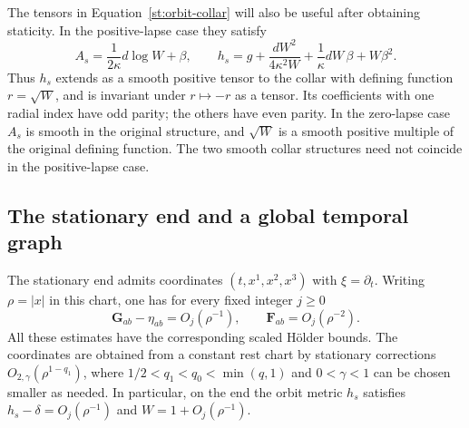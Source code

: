 \begin{remark}\label{st:orbit-boundary}
The tensors in Equation~\eqref{st:orbit-collar} will also be useful
after obtaining staticity.  In the positive-lapse case they satisfy
\[
 A_s=\frac{1}{2\kappa}d\log W+\beta,
 \qquad
 h_s=g+\frac{dW^2}{4\kappa^2W}
       +\frac{1}{\kappa}dW\,\beta+W\beta^2.
\]
Thus $h_s$ extends as a smooth positive tensor to the collar with
defining function $r=\sqrt W$, and is invariant under $r\mapsto-r$
as a tensor.  Its coefficients with one radial index have odd
parity; the others have even parity.  In the zero-lapse case $A_s$
is smooth in the original structure, and $\sqrt W$ is a smooth
positive multiple of the original defining function.  The two
smooth collar structures need not coincide in the positive-lapse
case.
\end{remark}

\subsection{The stationary end and a global temporal graph}

\begin{proposition}\label{st:stationary-end}
The stationary end admits coordinates $(t,x^1,x^2,x^3)$ with
$\xi=\partial_t$.  Writing $\rho=|x|$ in this chart, one has for
every fixed integer $j\geq0$
\begin{equation}\label{st:strong-end}
 \mathbf G_{ab}-\eta_{ab}=O_j(\rho^{-1}),\qquad
 \mathbf F_{ab}=O_j(\rho^{-2}).
\end{equation}
All these estimates have the corresponding scaled H\"older bounds.
The coordinates are obtained from a constant rest chart by stationary
corrections $O_{2,\gamma}(\rho^{1-q_1})$, where
$1/2<q_1<q_0<\min(q,1)$ and $0<\gamma<1$ can be chosen smaller
as needed.  In particular, on the end the orbit metric $h_s$ satisfies
$h_s-\delta=O_j(\rho^{-1})$ and $W=1+O_j(\rho^{-1})$.
\end{proposition}

